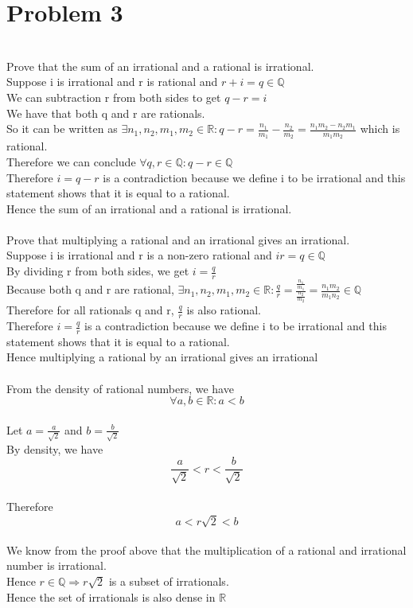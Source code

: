 \documentclass{article}
\begin{document}
\section*{Problem 3}
\\Prove that the sum of an irrational and a rational is irrational.
\\Suppose i is irrational and r is rational and $r + i = q \in \mathbb{Q}$
\\We can subtraction r from both sides to get $q - r = i$
\\We have that both q and r are rationals.
\\So it can be written as $\exists n_1, n_2, m_1, m_2 \in \mathbb{R} : q - r = \frac{n_1}{m_1} - \frac{n_2}{m_2} = \frac{n_1m_2 - n_2m_1}{m_1m_2}$ which is rational. 
\\Therefore we can conclude $\forall q,r \in \mathbb{Q} : q - r \in \mathbb{Q}$
\\Therefore $i = q - r$ is a contradiction because we define i to be irrational and this statement shows that it is equal to a rational.
\\Hence the sum of an irrational and a rational is irrational.
\\
\\Prove that multiplying a rational and an irrational gives an irrational.
\\Suppose i is irrational and r is a non-zero rational and $ir = q \in \mathbb{Q}$
\\By dividing r from both sides, we get $i = \frac{q}{r}$
\\Because both q and r are rational, $\exists n_1,n_2,m_1,m_2 \in \mathbb{R} : \frac{q}{r} = \frac{\frac{n_1}{m_1}}{\frac{n_2}{m_2}} = \frac{n_1m_2}{m_1n_2} \in \mathbb{Q}$
\\Therefore for all rationals q and r, $\frac{q}{r}$ is also rational.
\\Therefore $i = \frac{q}{r}$ is a contradiction because we define i to be irrational and this statement shows that it is equal to a rational.
\\Hence multiplying a rational by an irrational gives an irrational
\\
\\From the density of rational numbers, we have $$\forall a,b \in \mathbb{R} : a < b$$
\\Let $a = \frac{a}{\sqrt{2}}$ and $b = \frac{b}{\sqrt{2}}$
\\By density, we have $$\frac{a}{\sqrt{2}} < r < \frac{b}{\sqrt{2}}$$
\\Therefore $$a < r\sqrt{2} < b$$
\\We know from the proof above that the multiplication of a rational and irrational number is irrational. 
\\Hence $r \in \mathbb{Q} \Rightarrow r\sqrt{2}$ is a subset of irrationals.
\\Hence the set of irrationals is also dense in $\mathbb{R}$
\end{document}
